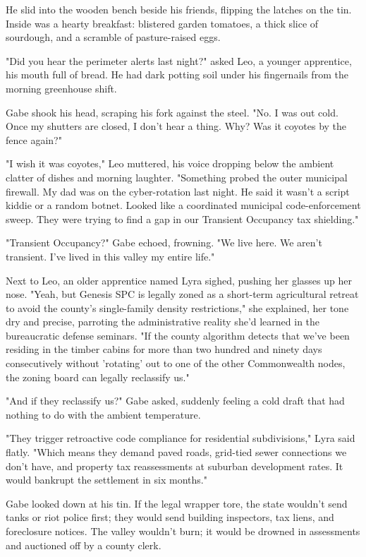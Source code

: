 He slid into the wooden bench beside his friends, flipping the latches on the tin. Inside was a hearty breakfast: blistered garden tomatoes, a thick slice of sourdough, and a scramble of pasture-raised eggs. 

"Did you hear the perimeter alerts last night?" asked Leo, a younger apprentice, his mouth full of bread. He had dark potting soil under his fingernails from the morning greenhouse shift. 

Gabe shook his head, scraping his fork against the steel. "No. I was out cold. Once my shutters are closed, I don't hear a thing. Why? Was it coyotes by the fence again?"

"I wish it was coyotes," Leo muttered, his voice dropping below the ambient clatter of dishes and morning laughter. "Something probed the outer municipal firewall. My dad was on the cyber-rotation last night. He said it wasn't a script kiddie or a random botnet. Looked like a coordinated municipal code-enforcement sweep. They were trying to find a gap in our Transient Occupancy tax shielding."

"Transient Occupancy?" Gabe echoed, frowning. "We live here. We aren't transient. I’ve lived in this valley my entire life."

Next to Leo, an older apprentice named Lyra sighed, pushing her glasses up her nose. "Yeah, but Genesis SPC is legally zoned as a short-term agricultural retreat to avoid the county's single-family density restrictions," she explained, her tone dry and precise, parroting the administrative reality she’d learned in the bureaucratic defense seminars. "If the county algorithm detects that we've been residing in the timber cabins for more than two hundred and ninety days consecutively without 'rotating' out to one of the other Commonwealth nodes, the zoning board can legally reclassify us."

"And if they reclassify us?" Gabe asked, suddenly feeling a cold draft that had nothing to do with the ambient temperature.

"They trigger retroactive code compliance for residential subdivisions," Lyra said flatly. "Which means they demand paved roads, grid-tied sewer connections we don't have, and property tax reassessments at suburban development rates. It would bankrupt the settlement in six months."

Gabe looked down at his tin. If the legal wrapper tore, the state wouldn't send tanks or riot police first; they would send building inspectors, tax liens, and foreclosure notices. The valley wouldn't burn; it would be drowned in assessments and auctioned off by a county clerk.

